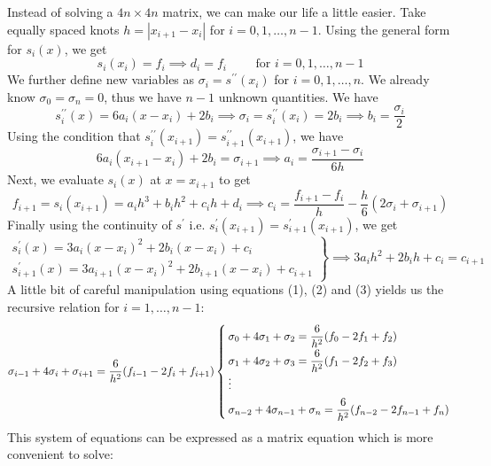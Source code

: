 \documentclass[11pt]{article}
\theoremstyle{definition}
\begin{document}
Instead of solving a $4n\times 4n$ matrix, we can make our life a little easier. Take equally spaced knots $h=|x_{i+1}-x_i|$ for $i=0,1,\dots, n-1$. Using the general form for $s_i(x)$, we get $$s_i(x_i)=f_i\implies \boxed{d_i=f_i}\text{ }\text{ }\text{ }\text{ for }i=0,1,\dots,n-1$$
We further define new variables as $\sigma_i=s^{\prime\prime}(x_i)$ for $i=0,1,\dots,n$. We already know $\sigma_0=\sigma_n=0$, thus we have $n-1$ unknown quantities. We have
\begin{equation}
s_i^{\prime\prime}(x)=6a_i(x-x_i)+2b_i\implies \sigma_i=s_i^{\prime\prime}(x_i)=2b_i\implies \boxed{b_i=\frac{\sigma_i}{2}}
\end{equation}
Using the condition that $s_i^{\prime\prime}(x_{i+1})=s_{i+1}^{\prime\prime}(x_{i+1})$, we have
\begin{equation}
6a_i(x_{i+1}-x_i)+2b_i=\sigma_{i+1}\implies \boxed{a_i=\frac{\sigma_{i+1}-\sigma_i}{6h}}
\end{equation}
Next, we evaluate $s_i(x)$ at $x=x_{i+1}$ to get
\begin{equation}
f_{i+1}=s_i(x_{i+1})=a_ih^3+b_ih^2+c_ih+d_i\implies \boxed{c_i=\frac{f_{i+1}-f_i}{h}-\frac{h}{6}(2\sigma_i+\sigma_{i+1})}
\end{equation}
Finally using the continuity of $s^{\prime}$ i.e. $s_i^{\prime}(x_{i+1})=s_{i+1}^{\prime}(x_{i+1})$, we get
$$\left.\begin{array}{r}
	s_i^{\prime}(x)=3a_i(x-x_i)^2+2b_i(x-x_i)+c_i\\
	s_{i+1}^{\prime}(x)=3a_{i+1}(x-x_i)^2+2b_{i+1}(x-x_i)+c_{i+1}
\end{array}\right\rbrace\implies 3a_ih^2+2b_ih+c_i=c_{i+1}$$
A little bit of careful manipulation using equations (1), (2) and (3) yields us the recursive relation for $i=1,\dots,n-1$: $$\sigma_{i-1}+4\sigma_i+\sigma_{i+1}=\dfrac{6}{h^2}(f_{i-1}-2f_i+f_{i+1})\left\lbrace\arraycolsep=2pt\def\arraystretch{1.8}
\begin{array}{l}
	\sigma_{0}+4\sigma_1+\sigma_{2}=\dfrac{6}{h^2}(f_{0}-2f_1+f_{2})\\
	\sigma_{1}+4\sigma_2+\sigma_{3}=\dfrac{6}{h^2}(f_{1}-2f_2+f_{3})\\
	\vdots\\
	\sigma_{n-2}+4\sigma_{n-1}+\sigma_{n}=\dfrac{6}{h^2}(f_{n-2}-2f_{n-1}+f_{n})\\
\end{array}\right.
$$
This system of equations can be expressed as a matrix equation which is more convenient to solve:
\end{document}
